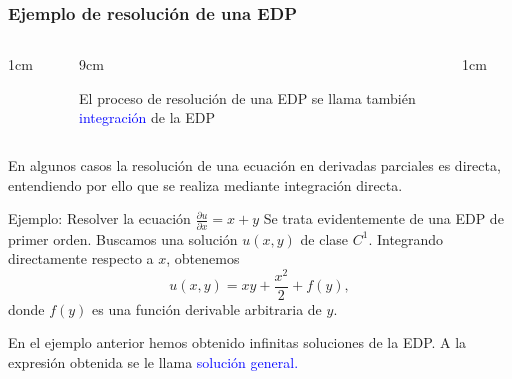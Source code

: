 \documentclass[compress]{beamer}
\begin{document}

\begin{frame}
\frametitle{Ejemplo de resoluci\'on de una EDP}
\small
\vspace{-0.5cm}
\begin{columns}
\begin{column}{1cm}
\end{column}
\begin{column}{9cm}
\begin{block}{}{
\begin{center}\textcolor{azul}{El proceso de resoluci\'on de una EDP se llama tambi\'en} \\ \textcolor{blue}{integraci\'on} \textcolor{azul}{de la EDP}
\end{center}}
\end{block}
\end{column}
\begin{column}{1cm}
\end{column}
\end{columns}
\vspace{0.3cm}
En algunos casos la resoluci\'on de una ecuaci\'on en derivadas parciales es directa, entendiendo
por ello que se realiza mediante integraci\'on directa.
\begin{block}{Ejemplo: Resolver la ecuaci\'on $\displaystyle \frac{\partial u}{\partial x} = x + y$}{
Se trata evidentemente de una EDP de primer orden. Buscamos una soluci\'on $u(x,y)$ de clase $C^1$.
Integrando directamente respecto a $x$, obtenemos
\[
u(x,y) = xy + \frac{x^2}{2} + f(y),
\]
donde $f(y)$ es una funci\'on derivable arbitraria de $y$.
}
\end{block}
En el ejemplo anterior hemos obtenido infinitas soluciones de la EDP. A la expresi\'on obtenida
se le llama \textcolor{blue}{soluci\'on general.}
\end{frame}

\end{document}
